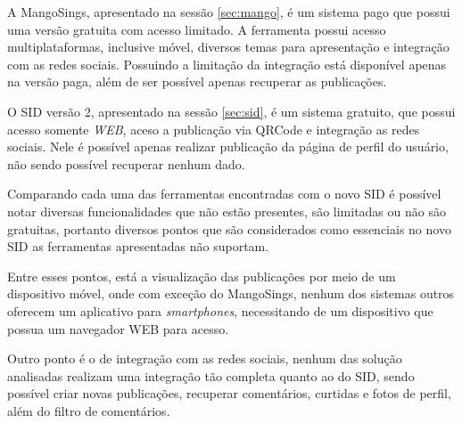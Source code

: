 A MangoSings, apresentado na sessão \ref{sec:mango}, é um sistema pago que possui uma versão gratuita com acesso limitado. A ferramenta possui acesso multiplataformas, inclusive móvel, diversos temas para apresentação e integração com as redes sociais. Possuindo a limitação da integração está disponível apenas na versão paga, além de ser possível apenas recuperar as publicações.

O SID versão 2, apresentado na sessão \ref{sec:sid}, é um sistema gratuito, que possui acesso somente \textit{WEB}, aceso a publicação via QRCode e integração as redes sociais. Nele é possível apenas realizar publicação da página de perfil do usuário, não sendo possível recuperar nenhum dado.


Comparando cada uma das ferramentas encontradas com o novo SID é possível notar diversas funcionalidades que não estão presentes, são limitadas ou não são gratuitas, portanto diversos pontos que são considerados como essenciais no novo SID as ferramentas apresentadas não suportam.

Entre esses pontos, está a visualização das publicações por meio de um dispositivo móvel, onde com exceção do MangoSings, nenhum dos sistemas outros oferecem um aplicativo para \textit{smartphones}, necessitando de um dispositivo que possua um navegador WEB para acesso.

Outro ponto é o de integração com as redes sociais, nenhum das solução analisadas realizam uma integração tão completa quanto ao do SID, sendo possível criar novas publicações, recuperar comentários, curtidas e fotos de perfil, além do filtro de comentários.


